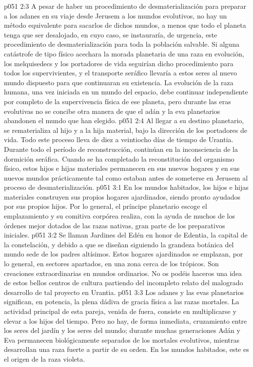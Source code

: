 \vs p051 2:3 \pc A pesar de haber un procedimiento de desmaterialización para preparar a los adanes en su viaje desde Jerusem a los mundos evolutivos, no hay un método equivalente para sacarlos de dichos mundos, a menos que todo el planeta tenga que ser desalojado, en cuyo caso, se instauraría, de urgencia, este procedimiento de desmaterialización para toda la población salvable. Si alguna catástrofe de tipo físico acechara la morada planetaria de una raza en evolución, los melquisedecs y los portadores de vida seguirían dicho procedimiento para todos los supervivientes, y el transporte seráfico llevaría a estos seres al nuevo mundo dispuesto para que continuaran su existencia. La evolución de la raza humana, una vez iniciada en un mundo del espacio, debe continuar independiente por completo de la supervivencia física de ese planeta, pero durante las eras evolutivas no se concibe otra manera de que el adán y la eva planetarios abandonen el mundo que han elegido.
\vs p051 2:4 \pc Al llegar a su destino planetario, se rematerializa al hijo y a la hija material, bajo la dirección de los portadores de vida. Todo este proceso lleva de diez a veintiocho días de tiempo de Urantia. Durante todo el período de reconstrucción, continúan en la inconsciencia de la dormición seráfica. Cuando se ha completado la reconstitución del organismo físico, estos hijos e hijas materiales permanecen en sus nuevos hogares y en sus nuevos mundos prácticamente tal como estaban antes de someterse en Jerusem al proceso de desmaterialización.
\vs p051 3:1 En los mundos habitados, los hijos e hijas materiales construyen sus propios hogares ajardinados, siendo pronto ayudados por sus propios hijos. Por lo general, el príncipe planetario escoge el emplazamiento y su comitiva corpórea realiza, con la ayuda de muchos de los órdenes mejor dotados de las razas nativas, gran parte de los preparativos iniciales.
\vs p051 3:2 Se llaman Jardines del Edén en honor de Edentia, la capital de la constelación, y debido a que se diseñan siguiendo la grandeza botánica del mundo sede de los padres altísimos. Estos hogares ajardinados se emplazan, por lo general, en sectores apartados, en una zona cerca de los trópicos. Son creaciones extraordinarias en mundos ordinarios. No os podéis haceros una idea de estos bellos centros de cultura partiendo del incompleto relato del malogrado desarrollo de tal proyecto en Urantia.
\vs p051 3:3 \pc Los adanes y las evas planetarios significan, en potencia, la plena dádiva de gracia física a las razas mortales. La actividad principal de esta pareja, venida de fuera, consiste en multiplicarse y elevar a los hijos del tiempo. Pero no hay, de forma inmediata, cruzamiento entre los seres del jardín y los seres del mundo; durante muchas generaciones Adán y Eva permanecen biológicamente separados de los mortales evolutivos, mientras desarrollan una raza fuerte a partir de su orden. En los mundos habitados, este es el origen de la raza violeta.
